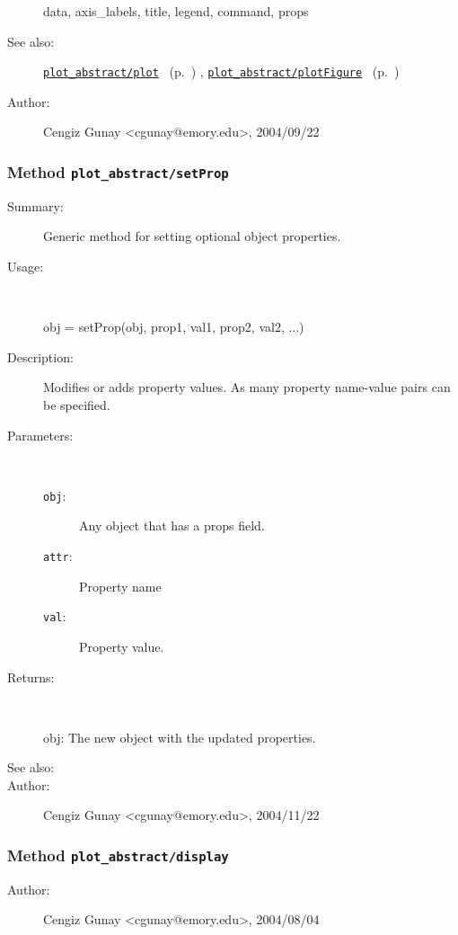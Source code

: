 \begin{description}
	data, axis\_labels, title, legend, command, props
%
%
\item[See also:]%
\hyperlink{ref_plot_abstract__plot}{\texttt{plot\_abstract/plot}}%
\ (p.~\pageref{ref_plot_abstract__plot})%
%
, \hyperlink{ref_plot_abstract__plotFigure}{\texttt{plot\_abstract/plotFigure}}%
\ (p.~\pageref{ref_plot_abstract__plotFigure})%
%
%
\item[Author:]%
Cengiz Gunay <cgunay@emory.edu>, 2004/09/22%
\end{description}
\methodline%
\subsubsection[Method \texttt{setProp}]{Method \texttt{plot\_abstract/setProp}}%
%
\label{ref_plot_abstract__setProp}%
\hypertarget{ref_plot_abstract__setProp}{}%
\begin{description}
\item[Summary:]Generic method for setting optional object properties.
%
\item[Usage:]~%
\begin{lyxcode}%
obj = setProp(obj, prop1, val1, prop2, val2, ...)
%
\end{lyxcode}%
%
\item[Description:]%
Modifies or adds property values. As many property name-value 
 pairs can be specified.
\item[Parameters:]~
\begin{description}%
\item[\texttt{obj}:]
 Any object that has a props field.
\item[\texttt{attr}:]
 Property name
\item[\texttt{val}:]
 Property value.
\end{description}%
%
\item[Returns:]~

	obj: The new object with the updated properties.
%
%
\item[See also:]%
%
\item[Author:]%
Cengiz Gunay <cgunay@emory.edu>, 2004/11/22%
\end{description}
\methodline%
\subsubsection[Method \texttt{display}]{Method \texttt{plot\_abstract/display}}%
%
\label{ref_plot_abstract__display}%
\hypertarget{ref_plot_abstract__display}{}%
\begin{description}
%
%
%
%
%
%
%
\item[Author:]%
Cengiz Gunay <cgunay@emory.edu>, 2004/08/04%
\end{description}
\methodline%
